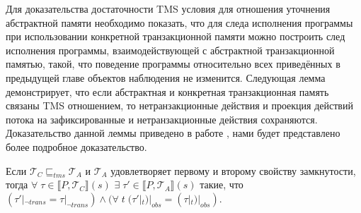 Для доказательства достаточности TMS условия для отношения уточнения абстрактной памяти необходимо показать, что для следа исполнения программы при использовании конкретной транзакционной памяти можно построить след исполнения программы, взаимодействующей с абстрактной транзакционной памятью, такой, что поведение программы относительно всех приведённых в предыдущей главе объектов  наблюдения не изменится. Следующая лемма демонстрирует, что если абстрактная и конкретная транзакционная память связаны TMS отношением, то нетранзакционные действия и проекция действий потока на зафиксированные и нетранзакционные действия сохраняются. Доказательство данной леммы приведено в работе \cite{tms_article}, нами будет представлено более подробное доказательство.     
\begin{lemma}\label{sufficiency5}
Если $\mathcal{T}_C \sqsubseteq_{tms} \mathcal{T}_A$ и $\mathcal{T}_A$ удовлетворяет первому и второму свойству замкнутости, тогда $\forall \; \tau \in \llbracket P, \mathcal{T}_C\rrbracket(s)$ $\exists \; \tau' \in \llbracket P, \mathcal{T}_A \rrbracket(s)$ такие, что $(\tau'|_{\neg trans} = \tau|_{\neg trans}) \land (\forall \; t \; (\tau'|_t)|_{obs} = (\tau|_t)|_{obs})$.\end{lemma}
